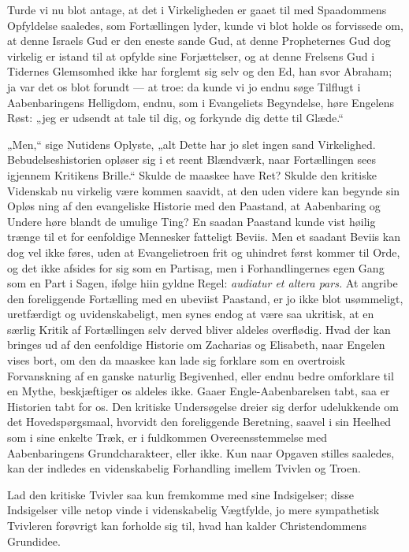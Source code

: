 \documentclass[12pt,a4paper]{book}
\begin{document}
Turde vi nu blot antage, at det i Virkeligheden er gaaet til med
Spaadommens Opfyldelse saaledes, som Fortællingen lyder, kunde vi
blot holde os forvissede om, at denne Israels Gud er den eneste
sande Gud, at denne Propheternes Gud dog virkelig er istand til at
opfylde sine Forjættelser, og at denne Frelsens Gud i Tidernes
Glemsomhed ikke har forglemt sig selv og den Ed, han svor Abraham;
ja var det os blot forundt --- at troe: da kunde vi jo endnu søge
Tilflugt i Aabenbaringens Helligdom, endnu, som i Evangeliets
Begyndelse, høre Engelens Røst: „jeg er udsendt at tale til dig,
og forkynde dig dette til Glæde.“

„Men,“ sige Nutidens Oplyste, „alt Dette har jo slet ingen sand
Virkelighed. Bebudelseshistorien opløser sig i et reent
Blændværk, naar Fortællingen sees igjennem Kritikens Brille.“
Skulde de maaskee have Ret? Skulde den kritiske Videnskab nu
virkelig være kommen saavidt, at den uden videre kan begynde sin
Opløs\-%
ning af den evangeliske Historie med den Paastand, at Aabenbaring
og Undere høre blandt de umulige Ting? En saadan Paastand kunde
vist høilig trænge til et for eenfoldige Mennesker fatteligt
Beviis. Men et saadant Beviis kan dog vel ikke føres, uden at
Evangelietroen frit og uhindret først kommer til Orde, og det ikke
afsides for sig som en Partisag, men i Forhandlingernes egen Gang
som en Part i Sagen, ifølge hiin gyldne Regel: \textit{audiatur et
altera pars.} At angribe den foreliggende Fortælling med en
ubeviist Paastand, er jo ikke blot usømmeligt, uretfærdigt og
uvidenskabeligt, men synes endog at være saa ukritisk, at en
særlig Kritik af Fortællingen selv derved bliver aldeles
overflødig. Hvad der kan bringes ud af den eenfoldige Historie om
Zacharias og Elisabeth, naar Engelen vises bort, om den da maaskee
kan lade sig forklare som en overtroisk Forvanskning af en ganske
naturlig Begivenhed, eller endnu bedre omforklare til en Mythe,
beskjæftiger os aldeles ikke. Gaaer Engle-Aabenbarelsen tabt, saa
er Historien tabt for os. Den kritiske Undersøgelse dreier sig
derfor udelukkende om det Hovedspørgsmaal, hvorvidt den
foreliggende Beretning, saavel i sin Heelhed som i sine enkelte
Træk, er i fuldkommen Overeensstemmelse med Aabenbaringens
Grundcharakteer, eller ikke. Kun naar Opgaven stilles saaledes,
kan der indledes en videnskabelig Forhandling imellem Tvivlen og
Troen.

Lad den kritiske Tvivler saa kun fremkomme med sine Indsigelser;
disse Indsigelser ville netop vinde i videnskabelig Vægtfylde, jo
mere sympathetisk Tvivleren forøvrigt kan forholde sig til, hvad
han kalder Christendommens Grundidee.
\end{document}
